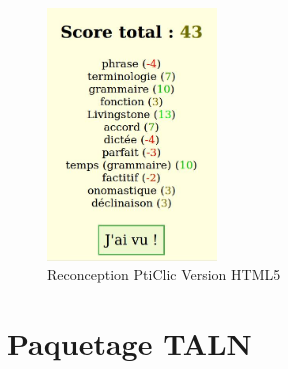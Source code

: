 \documentclass{beamer}
\begin{document}
\begin{frame}  
\begin{figure}[h!]
  \centering
      \includegraphics[width=0.4\textwidth]{img/preterit08.jpg}
\caption{Reconception PtiClic Version HTML5}
\end{figure}
\end{frame}



\section{Paquetage TALN}
\end{document}
